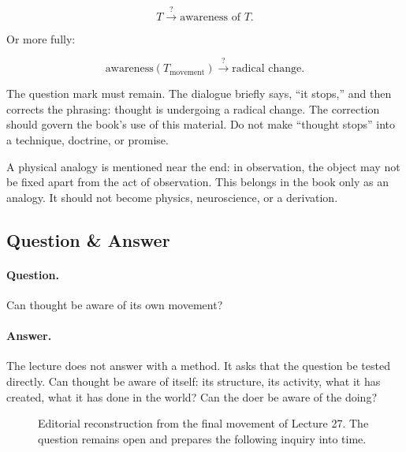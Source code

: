 \documentclass[11pt,oneside]{book}
\begin{document}
\begin{equation}
T
\overset{?}{\longrightarrow}
\text{awareness of }T.
\end{equation}

Or more fully:

\begin{equation}
\text{awareness}\!\left(T_{\mathrm{movement}}\right)
\overset{?}{\longrightarrow}
\text{radical change}.
\end{equation}

The question mark must remain. The dialogue briefly says, ``it stops,'' and then corrects the phrasing: thought is undergoing a radical change. The correction should govern the book's use of this material. Do not make ``thought stops'' into a technique, doctrine, or promise.

A physical analogy is mentioned near the end: in observation, the object may not be fixed apart from the act of observation. This belongs in the book only as an analogy. It should not become physics, neuroscience, or a derivation.

\subsection{Question \& Answer}

\paragraph{Question.}
Can thought be aware of its own movement?

\paragraph{Answer.}
The lecture does not answer with a method. It asks that the question be tested directly. Can thought be aware of itself: its structure, its activity, what it has created, what it has done in the world? Can the doer be aware of the doing?

\begin{figure}
\centering
{}
\caption{Editorial reconstruction from the final movement of Lecture 27. The question remains open and prepares the following inquiry into time.}
\end{figure}
\end{document}

